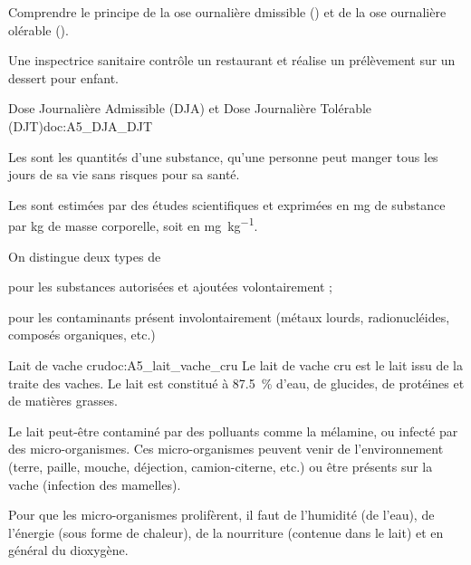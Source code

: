 \teteTermStssAlim



\begin{objectifs}
  \item Comprendre le principe de la ose ournalière dmissible ()
  et de la ose ournalière olérable ().
\end{objectifs}

\begin{contexte}
  Une inspectrice sanitaire contrôle un restaurant et réalise un prélèvement sur un dessert pour enfant.

\end{contexte}


\begin{doc}{Dose Journalière Admissible (DJA) et Dose Journalière Tolérable (DJT)}{doc:A5_DJA_DJT}
  \begin{importants}
    Les  sont les quantités d'une substance, qu'une personne peut manger tous les jours de sa vie sans risques pour sa santé.
  \end{importants}  

  Les  sont estimées par des études scientifiques et exprimées en \unit{\mg} de substance par \unit{\kg} de masse corporelle, soit en \unit{\mg\per\kg}.

  \begin{importants}
    On distingue deux types de 
    \begin{listePoints}  
      \item {} pour les substances autorisées et ajoutées volontairement ;
      \item {} pour les contaminants présent involontairement (métaux lourds, radionucléides, composés organiques, etc.)
    \end{listePoints}
  \end{importants}
\end{doc}

\begin{doc}{Lait de vache cru}{doc:A5_lait_vache_cru}
  Le lait de vache cru est le lait issu de la traite des vaches.
  Le lait est constitué à \qty{87,5}{\percent} d'eau, de glucides, de protéines et de matières grasses.

  Le lait peut-être contaminé par des polluants comme la mélamine, ou infecté par des micro-organismes.
  Ces micro-organismes peuvent venir de l'environnement (terre, paille, mouche, déjection, camion-citerne, etc.) ou être présents sur la vache (infection des mamelles).

  Pour que les micro-organismes prolifèrent, il faut de l'humidité (de l'eau), de l'énergie (sous forme de chaleur), de la nourriture (contenue dans le lait) et en général du dioxygène.
\end{doc}

